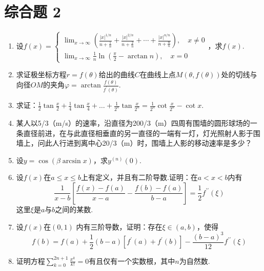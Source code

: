 \section{综合题 2}
\begin{enumerate}
	\item 设$ f ( x ) = \left\{ \begin{array} { l } { \lim _ { x \rightarrow \infty } \left( \frac { | x | ^ { 1 / n } } { n + \frac { 1 } { n } } + \frac { | x | ^ { 2 / n } } { n + \frac { 2 } { n } } + \cdots + \frac { | x | ^ { n / n } } { n + \frac { n } { n } } \right) , \quad x \neq 0 } \\ { \lim _ { x \rightarrow \infty } \frac { 1 } { n } \ln \left( \frac { \pi } { 2 } - \arctan n \right) , \quad x = 0 } \end{array} \right.$，求$f(x)$.
	\item 求证极坐标方程$r=f(\theta)$给出的曲线$C$在曲线上点$M(\theta,f(\theta))$处的切线与向径$OM$的夹角$\varphi = \arctan \frac { f ( \theta ) } { f ^ { \prime } ( \theta ) }$.
	\item 求证：$\frac { 1 } { 2 } \tan \frac { x } { 2 } + \frac { 1 } { 4 } \tan \frac { x } { 4 } + \dots + \frac { 1 } { 2 ^ { n } } \tan \frac { x } { 2 ^ { n } } = \frac { 1 } { 2 ^ { n } } \cot \frac { x } { 2 ^ { n } } - \cot x$.
	\item 某人以5/3（m/s）的速率，沿直径为200/3（m）四周有围墙的圆形球场的一条直径前进，在与此直径相垂直的另一直径的一端有一灯，灯光照射人影于围墙上，问此人行进到离中心20/3（m）时，围墙上人影的移动速率是多少？
	\item 设$y=\cos (\beta\arcsin x)$，求$y^{(n)}(0)$.
	\item 设$f(x)$在$a\leq x\leq b$上有定义，并且有二阶导数.证明：在$a<x<b$内有
	\[\frac { 1 } { x - b } \left[ \frac { f ( x ) - f ( a ) } { x - a } - \frac { f ( b ) - f ( a ) } { b - a } \right] = \frac { 1 } { 2 } f ^ { \prime \prime } ( \xi )\]
	这里$\xi $是$a$与$b$之间的某数.
	\item 设$f(x)$在$(0,1)$ 内有三阶导数，证明：存在$\xi \in(a,b)$，使得
	\[f ( b ) = f ( a ) + \frac { 1 } { 2 } ( b - a ) \left[ f ^ { \prime } ( a ) + f ^ { \prime } ( b ) \right] - \frac { ( b - a ) ^ { 3 } } { 12 } f ^ { \prime \prime } ( \xi )\]
	\item 证明方程$\sum _ { k = 0 } ^ { 2 n + 1 } \frac { x ^ { k } } { k ! } = 0$有且仅有一个实数根，其中$n$为自然数.
	

\end{enumerate}

